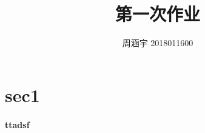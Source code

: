\documentclass[UTF8,c5size]{ctexart}
\title{第一次作业}
\author{周涵宇 2018011600}
\date{}
\begin{document}
\maketitle

\section[1]{sec1}

\paragraph{ttadsf}
    
\end{document}
